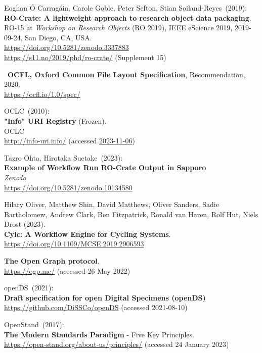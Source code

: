 \begin{thebibliography}{9}
Eoghan Ó Carragáin, Carole Goble, Peter Sefton, Stian Soiland-Reyes~(2019): \\
\textbf{RO-Crate: A lightweight approach to research object data packaging}.\\
RO-15 at \emph{Workshop on Research Objects} (RO 2019), IEEE eScience 2019, 2019-09-24, San Diego, CA, USA.\\
\url{https://doi.org/10.5281/zenodo.3337883}\\
\url{https://s11.no/2019/phd/ro-crate/}
(Supplement 15)

~\textbf{OCFL, Oxford Common File Layout Specification},
Recommendation, 2020.\\
\url{https://ocfl.io/1.0/spec/}

OCLC~(2010): \\
\textbf{"Info" {URI Registry}} ({Frozen}). \\
OCLC\\
\url{http://info-uri.info/} 
(accessed \href{https://web.archive.org/web/20231106015204/https://oclc-research.github.io/infoURI-Frozen/}{2023-11-06})

Tazro Ohta, Hirotaka Suetake~(2023): \\
\textbf{Example of Workflow Run RO-Crate Output in Sapporo}\\
\emph{Zenodo}\\
\url{https://doi.org/10.5281/zenodo.10134580}

Hilary Oliver, Matthew Shin, David Matthews, Oliver Sanders, Sadie Bartholomew, Andrew Clark, Ben Fitzpatrick, Ronald van Haren, Rolf Hut, Niels Drost
(2023).\\
\textbf{Cylc: A Workflow Engine for Cycling Systems}.\\
\url{https://doi.org/10.1109/MCSE.2019.2906593}

\textbf{The {Open Graph} protocol}.  \\
\url{https://ogp.me/}
(accessed 26 May 2022)

openDS~(2021): \\
\textbf{Draft specification for open Digital Specimens (openDS)}\\
\url{https://github.com/DiSSCo/openDS} (accessed 2021-08-10)

OpenStand~(2017): \\
\textbf{The {Modern Standards Paradigm}} - {Five Key Principles}.\\
\url{https://open-stand.org/about-us/principles/} (accessed 24 January
2023)


\end{thebibliography}
